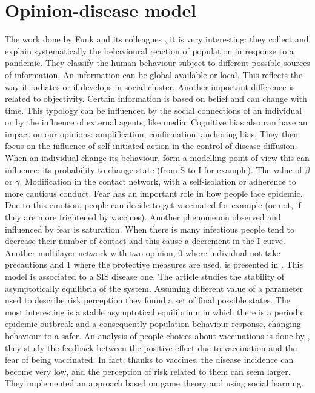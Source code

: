 \section{Opinion-disease model}
The work done by Funk and its colleagues \cite{ Funk_2010}, it is very interesting: they collect and explain systematically the behavioural reaction of population in response to a pandemic. They classify the human behaviour subject to different possible sources of information. An information can be global available or local. This reflects the way it radiates or if develops in social cluster. Another important difference is related to objectivity. Certain information is based on belief and can change with time. This typology can be influenced by the social connections of an individual or by the influence of external agents, like media. Cognitive bias also can have an impact on our opinions: amplification, confirmation, anchoring bias. They then focus on the influence of self-initiated action in the control of disease diffusion. When an individual change its behaviour, form a modelling point of view this can influence: its probability to change state (from S to I for example). The value of $\beta$ or $\gamma$. Modification in the contact network, with a self-isolation or adherence to more cautious conduct. Fear has an important role in how people face epidemic. Due to this emotion, people can decide to get vaccinated for example (or not, if they are more frightened by vaccines). Another phenomenon observed and influenced by fear is saturation. When there is many infectious people tend to decrease their number of contact and this cause a decrement in the I curve.  Another multilayer network with two opinion, 0 where individual not take precautions and 1 where the protective measures are used, is presented in \cite{Frieswijk_2022}. This model is associated to a SIS disease one. The article studies the stability of asymptotically equilibria of the system. Assuming different value of a parameter used to describe risk perception they found a set of final possible states. The most interesting is a stable asymptotical equilibrium in which there is a periodic epidemic outbreak and a consequently population behaviour response, changing behaviour to a safer.
An analysis of people choices about vaccinations is done by \cite{Bauch_2012}, they study the feedback between the positive effect due to vaccination and the fear of being vaccinated. In fact, thanks to vaccines, the disease incidence can become very low, and the perception of risk related to them can seem larger. They implemented an approach based on game theory and using social learning.
